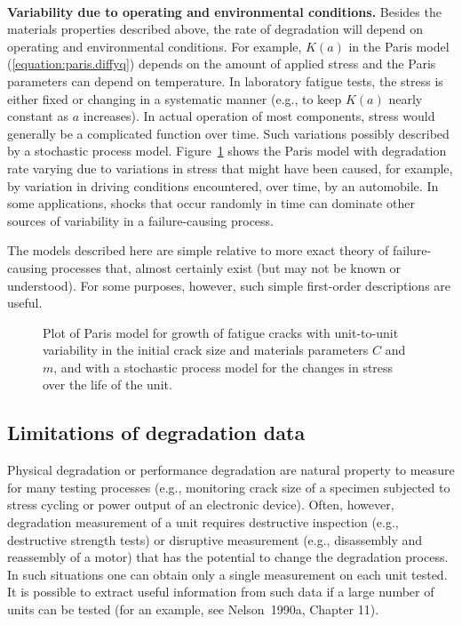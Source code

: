 \mbox{  }\\
\noindent
{\bf Variability due to operating and environmental conditions.}
Besides the materials properties described above, the rate of degradation
will depend on operating and environmental conditions.  For example,
$K(a)$ in the Paris model (\ref{equation:paris.diffyq}) depends on
the amount of applied stress and the Paris parameters can depend on 
temperature. In laboratory fatigue tests, the stress
is either fixed or changing in a systematic manner (e.g., to keep
$K(a)$ nearly constant as $a$ increases). In actual operation
of most components, stress would generally be a complicated function over 
time. Such variations possibly described by a stochastic process model. 
Figure~\ref{figure:paris.degradation.stochm.stosig.ps}
shows the Paris model with degradation rate varying due to variations
in stress that might have been caused, for example, by variation in
driving conditions encountered, over time, by an automobile. In some
applications, shocks that occur randomly in time can dominate other sources
of variability in a failure-causing process.

The models described here are simple relative to more exact theory of
failure-causing processes that, almost certainly exist (but may not be
known or understood). For some purposes, however, such simple first-order
descriptions are useful.

\begin{figure}
\caption{Plot of Paris model for growth of fatigue cracks
with unit-to-unit variability in the initial crack size and
materials parameters $C$ and $m$, and with a stochastic process
model for the changes in stress over the life of the unit.}
\label{figure:paris.degradation.stochm.stosig.ps}
\end{figure}

\subsection{Limitations of degradation data}
Physical degradation or performance degradation are natural property
to measure for many testing processes (e.g., monitoring crack size
of a specimen subjected to stress cycling or power output of an
electronic device). Often, however, degradation measurement of a
unit requires destructive inspection (e.g., destructive strength
tests) or disruptive measurement (e.g., disassembly and reassembly
of a motor) that has the potential to change the degradation process. In
such situations one can obtain only a single measurement on each
unit tested. It is possible to extract useful information from such
data if a large number of units can be tested (for an example, see
Nelson~1990a, Chapter 11).

